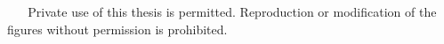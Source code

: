 {%
  \copyrighttext%
  {\copyrightmetastring\ \allrightsreservedeng}%
  {%
    \copyrightstring\ \allrightsreservedeng
    \blockpar
    Private use of this thesis is permitted. Reproduction or
    modification of the figures without permission is prohibited.
  }
}
